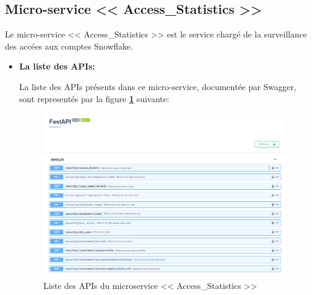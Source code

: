 \subsection{Micro-service << Access\_Statistics >>}
\par Le micro-service << Access\_Statistics >>  est le service chargé de la surveillance des accées aux comptes Snowflake.
\begin{itemize}
    \item \textbf{La liste des APIs:}
        \par La liste des APIs présents dans ce micro-service, documentée par Swagger, sont representés par la figure \textbf{\ref{fig:apiAccess}} suivante:
        \begin{figure}[H]
            \centering
            \includegraphics[width =1\linewidth]{img/captures/access_apis.PNG}
            \caption{Liste des APIs du microservice << Access\_Statistics >> }
                \label{fig:apiAccess}
        \end{figure}


\end{itemize}
